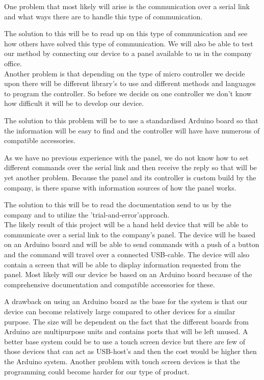\documentclass[a4paper]{article}
\begin{document}
        \noindent One problem that most likely will arise is the communication over a serial link and what ways there are to handle this type of communication.

        The solution to this will be to read up on this type of communication and see how others have solved this type of communication. We will also be able to test our method by connecting our device to a panel available to us in the company office.\\

        \noindent Another problem is that depending on the type of micro controller we decide upon there will be different library's to use and different methods and languages to program the controller. So before we decide on one controller we don't know how difficult it will be to develop our device.

        The solution to this problem will be to use a standardised Arduino board so that the information will be easy to find and the controller will have have numerous of compatible accessories. \newpage

        \noindent As we have no previous experience with the panel, we do not know how to set different commands over the serial link and then receive the reply so that will be yet another problem. Because the panel and its controller is custom build by the company, is there sparse with information sources of how the panel works.

        The solution to this will be to read the documentation send to us by the company and to utilize the 'trial-and-error'approach. \\

        \noindent The likely result of this project will be a hand held device that will be able to communicate over a serial link to the company's panel. The device will be based on an Arduino board and will be able to send commands with a push of a button and the command will travel over a connected USB-cable. The device will also contain a screen that will be able to display information requested from the panel. Most likely will our device be based on an Arduino board because of the comprehensive documentation and compatible accessories for these.

        A drawback on using an Arduino board as the base for the system is that our device can become relatively large compared to other devices for a similar purpose. The size will be dependent on the fact that the different boards from Arduino are multipurpose units and contains ports that will be left unused. A better base system could be to use a touch screen device but there are few of those devices that can act as USB-host's and then the cost would be higher then the Arduino system. Another problem with touch screen devices is that the programming could become harder for our type of product.
\end{document}

